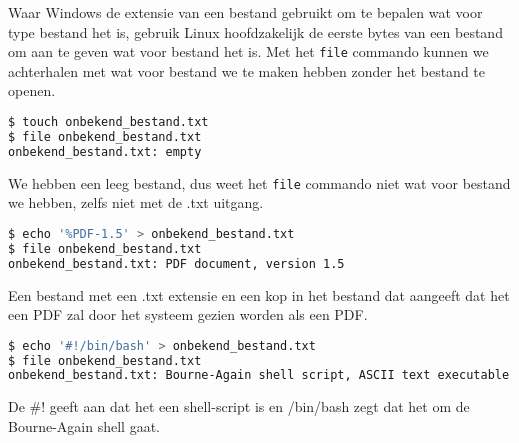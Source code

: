 Waar Windows de extensie van een bestand gebruikt om te bepalen wat voor type bestand het is, gebruik Linux hoofdzakelijk de eerste bytes van een bestand om aan te geven wat voor bestand het is. Met het \texttt{file} commando kunnen we achterhalen met wat voor bestand we te maken hebben zonder het bestand te openen.

\begin{lstlisting}[language=bash]
$ touch onbekend_bestand.txt
$ file onbekend_bestand.txt
onbekend_bestand.txt: empty
\end{lstlisting}
We hebben een leeg bestand, dus weet het \texttt{file} commando niet wat voor bestand we hebben, zelfs niet met de .txt uitgang.

\begin{lstlisting}[language=bash]
$ echo '%PDF-1.5' > onbekend_bestand.txt
$ file onbekend_bestand.txt
onbekend_bestand.txt: PDF document, version 1.5
\end{lstlisting}
Een bestand met een .txt extensie en een kop in het bestand dat aangeeft dat het een PDF zal door het systeem gezien worden als een PDF.

\begin{lstlisting}[language=bash]
$ echo '#!/bin/bash' > onbekend_bestand.txt
$ file onbekend_bestand.txt
onbekend_bestand.txt: Bourne-Again shell script, ASCII text executable
\end{lstlisting}
De \#! geeft aan dat het een shell-script is en /bin/bash zegt dat het om de Bourne-Again shell gaat.

